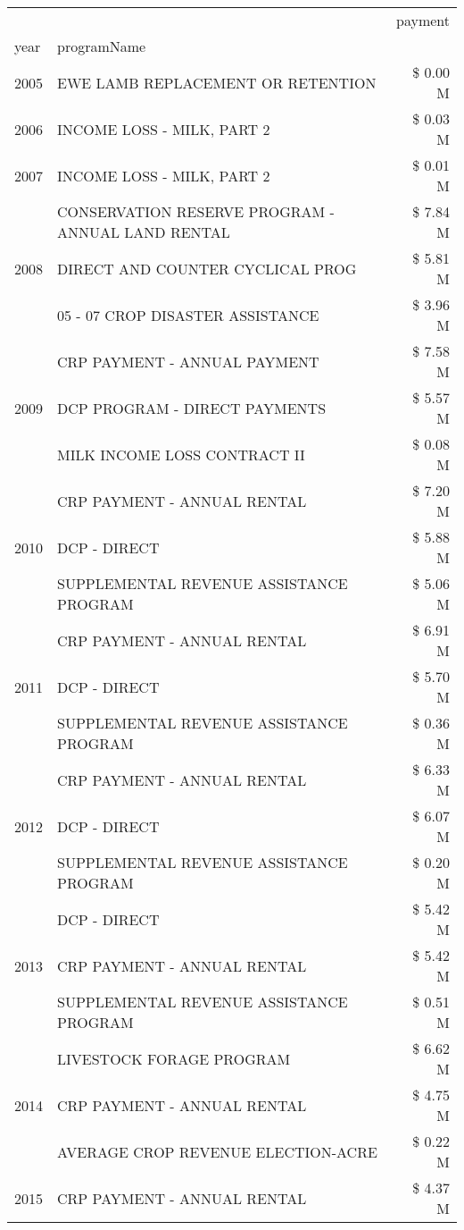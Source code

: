 \begin{tabular}{llr}
\toprule
 &  & payment \\
year & programName &  \\
\midrule
2005 & EWE LAMB REPLACEMENT OR RETENTION & \$ 0.00 M \\
\cline{1-3}
2006 & INCOME LOSS - MILK, PART 2 & \$ 0.03 M \\
\cline{1-3}
2007 & INCOME LOSS - MILK, PART 2 & \$ 0.01 M \\
\cline{1-3}
\multirow[t]{3}{*}{2008} & CONSERVATION RESERVE PROGRAM - ANNUAL LAND RENTAL & \$ 7.84 M \\
 & DIRECT AND COUNTER CYCLICAL PROG & \$ 5.81 M \\
 & 05 - 07 CROP DISASTER ASSISTANCE & \$ 3.96 M \\
\cline{1-3}
\multirow[t]{3}{*}{2009} & CRP PAYMENT - ANNUAL PAYMENT & \$ 7.58 M \\
 & DCP PROGRAM - DIRECT PAYMENTS & \$ 5.57 M \\
 & MILK INCOME LOSS CONTRACT II & \$ 0.08 M \\
\cline{1-3}
\multirow[t]{3}{*}{2010} & CRP PAYMENT - ANNUAL RENTAL & \$ 7.20 M \\
 & DCP - DIRECT & \$ 5.88 M \\
 & SUPPLEMENTAL REVENUE ASSISTANCE PROGRAM & \$ 5.06 M \\
\cline{1-3}
\multirow[t]{3}{*}{2011} & CRP PAYMENT - ANNUAL RENTAL & \$ 6.91 M \\
 & DCP - DIRECT & \$ 5.70 M \\
 & SUPPLEMENTAL REVENUE ASSISTANCE PROGRAM & \$ 0.36 M \\
\cline{1-3}
\multirow[t]{3}{*}{2012} & CRP PAYMENT - ANNUAL RENTAL & \$ 6.33 M \\
 & DCP - DIRECT & \$ 6.07 M \\
 & SUPPLEMENTAL REVENUE ASSISTANCE PROGRAM & \$ 0.20 M \\
\cline{1-3}
\multirow[t]{3}{*}{2013} & DCP - DIRECT & \$ 5.42 M \\
 & CRP PAYMENT - ANNUAL RENTAL & \$ 5.42 M \\
 & SUPPLEMENTAL REVENUE ASSISTANCE PROGRAM & \$ 0.51 M \\
\cline{1-3}
\multirow[t]{3}{*}{2014} & LIVESTOCK FORAGE PROGRAM & \$ 6.62 M \\
 & CRP PAYMENT - ANNUAL RENTAL & \$ 4.75 M \\
 & AVERAGE CROP REVENUE ELECTION-ACRE & \$ 0.22 M \\
\cline{1-3}
\multirow[t]{3}{*}{2015} & CRP PAYMENT - ANNUAL RENTAL & \$ 4.37 M \\

\end{tabular}
